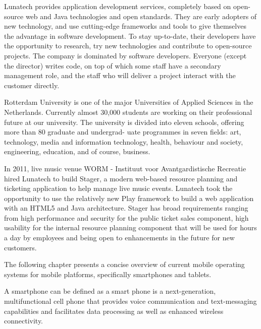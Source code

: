 Lunatech provides application development services, completely based on open-source web and Java technologies and open standards. They are early adopters of new technology, and use cutting-edge frameworks and tools to give themselves the advantage in software development. To stay up-to-date, their developers have the opportunity to research, try new technologies and contribute to open-source projects. The company is dominated by software developers. Everyone (except the director) writes code, on top of which some staff have a secondary management role, and the staff who will deliver a project interact with the customer directly.

Rotterdam University is one of the major Universities of Applied Sciences in the Netherlands. Currently almost 30,000 students are working on their professional future at our university.
The university is divided into eleven schools, offering more than 80 graduate and undergrad- uate programmes in seven fields: art, technology, media and information technology, health, behaviour and society, engineering, education, and of course, business.\cite{HogeschoolRotterdam2012}

In 2011, live music venue WORM - Instituut voor Avantgardistische Recreatie hired Lunatech to build Stager, a modern web-based resource planning and ticketing application to help manage live music events. Lunatech took the opportunity to use the relatively new Play framework to build a web application with an HTML5 and Java architecture. Stager has broad requirements ranging from high performance and security for the public ticket sales component, high usability for the internal resource planning component that will be used for hours a day by employees and being open to enhancements in the future for new customers.



The following chapter presents a concise overview of current mobile operating systems for mobile platforms, specifically smartphones and tablets.

A smartphone can be defined as a smart phone is a next-generation, multifunctional cell phone that provides voice communication and text-messaging capabilities and facilitates data processing as well as enhanced wireless connectivity.\cite{Ni2006}

